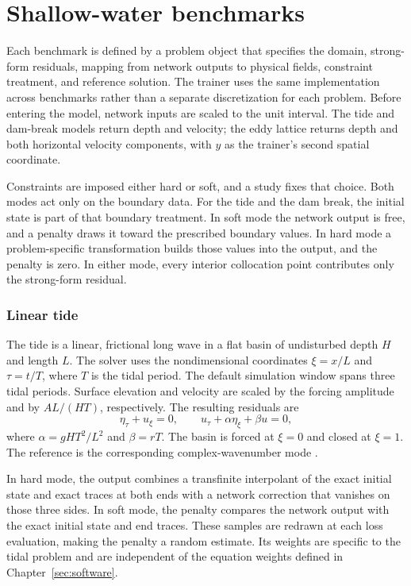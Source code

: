 \documentclass{erdc}
\begin{document}
\chapter{Shallow-water benchmarks}
\label{sec:benchmarks}

Each benchmark is defined by a problem object that specifies the domain,
strong-form residuals, mapping from network outputs to physical fields,
constraint treatment, and reference solution. The trainer uses the same
implementation across benchmarks rather than a separate discretization
for each problem. Before entering the model, network inputs are scaled to
the unit interval. The tide and dam-break models return depth and
velocity; the eddy lattice returns depth and both horizontal velocity
components, with \(y\) as the trainer's second spatial coordinate.

Constraints are imposed either hard or soft, and a study fixes that
choice. Both modes act only on the boundary data. For the tide and the
dam break, the initial state is part of that boundary treatment. In soft
mode the network output is free, and a penalty draws it toward the
prescribed boundary values. In hard mode a problem-specific
transformation builds those values into the output, and the penalty is
zero. In either mode, every interior collocation point contributes only
the strong-form residual.

\subsection{Linear tide}
\label{sec:tide}

The tide is a linear, frictional long wave in a flat basin of
undisturbed depth \(H\) and length \(L\). The solver uses the
nondimensional coordinates \(\xi=x/L\) and \(\tau=t/T\), where \(T\) is
the tidal period. The default simulation window spans three tidal
periods. Surface elevation and velocity are scaled by the forcing
amplitude and by \(AL/(HT)\), respectively. The resulting residuals are
\begin{equation}
\label{eq:tide}
\eta_{\tau}+u_{\xi}=0,
\qquad
u_{\tau}+\alpha\eta_{\xi}+\beta u=0,
\end{equation}
where \(\alpha=gHT^{2}/L^{2}\) and \(\beta=rT\). The basin is forced at
\(\xi=0\) and closed at \(\xi=1\). The reference is the corresponding
complex-wavenumber mode \cite{Dean1991}.

In hard mode, the output combines a transfinite interpolant of the exact
initial state and exact traces at both ends with a network correction
that vanishes on those three sides. In soft mode, the penalty compares
the network output with the exact initial state and end traces. These samples are redrawn at
each loss evaluation, making the penalty a random estimate. Its weights
are specific to the tidal problem and are independent of the equation
weights defined in Chapter~\ref{sec:software}.
\end{document}
